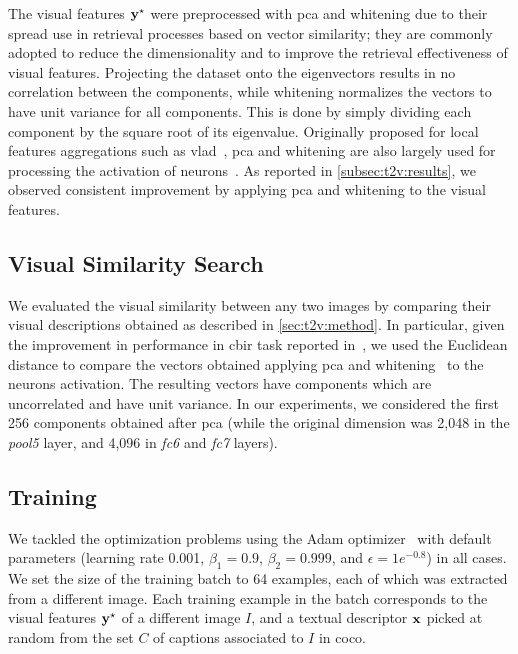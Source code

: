 The visual features $\mathbf{y}^\star$ were preprocessed with \gls{pca} and whitening due to their spread use in retrieval processes based on vector similarity;
they are commonly adopted to reduce the dimensionality and to improve the retrieval effectiveness of visual features.
Projecting the dataset onto the eigenvectors results in no correlation between the components, while whitening normalizes the vectors to have unit variance for all components.
This is done by simply dividing each component by the square root of its eigenvalue.
Originally proposed for local features aggregations such as \gls{vlad}~\cite{jegou2012negative}, \gls{pca} and whitening are also largely used for processing the activation of neurons~\cite{sharif2014cnn,gong2014multi,gordo2016deep}.
As reported in \ref{subsec:t2v:results}, we observed consistent improvement by applying \gls{pca} and whitening to the visual features.



\subsection{Visual Similarity Search}

We evaluated the visual similarity between any two images by comparing their visual descriptions obtained as described in \ref{sec:t2v:method}.
In particular, given the improvement in performance in \gls{cbir} task reported in~\cite{sharif2014cnn,gong2014multi,gordo2016deep}, we used the Euclidean distance to compare the vectors obtained applying \gls{pca} and whitening~\cite{comon1994independent} to the neurons activation.
The resulting vectors have components which are uncorrelated and have unit variance.
In our experiments, we considered the first 256 components obtained after \gls{pca} (while the original dimension was 2,048 in the \emph{pool5} layer, and 4,096 in \emph{fc6} and \emph{fc7} layers).


\subsection{Training}

We tackled the optimization problems using the Adam optimizer~\cite{kingma2014adam} with default parameters (learning rate 0.001, $\beta_1=\text{0.9}$, $\beta_2=\text{0.999}$, and $\epsilon=1e^{-0.8}$) in all cases.
We set the size of the training batch to 64 examples, each of which was extracted from a different image.
Each training example in the batch corresponds to the visual features $\mathbf{y}^\star$ of a different image $I$, and a textual descriptor $\mathbf{x}$ picked at random from the set $C$ of captions associated to $I$ in \gls{coco}.

